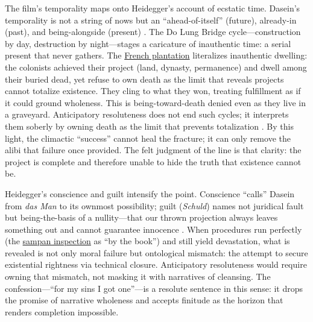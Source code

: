 The film's temporality maps onto Heidegger's account of ecstatic time. Dasein's temporality is
not a string of nows but an ``ahead-of-itself'' (future), already-in (past), and being-alongside
(present) \parencite[pp.~373--383]{HeideggerBT1962}. The Do Lung Bridge cycle—construction by
day, destruction by night—stages a caricature of inauthentic time: a serial present that never
gathers. The \hyperref[scene:french-plantation]{French plantation} literalizes inauthentic
dwelling: the colonists achieved their project (land, dynasty, permanence) and dwell among
their buried dead, yet refuse to own death as the limit that reveals projects cannot totalize
existence. They cling to what they won, treating fulfillment as if it could ground wholeness.
This is being-toward-death denied even as they live in a graveyard. Anticipatory resoluteness
does not end such cycles; it interprets them soberly by owning death as the limit that
prevents totalization \parencite[pp.~307--311]{HeideggerBT1962}. By this light, the climactic
``success'' cannot heal the fracture; it can only remove the alibi that failure once provided.
The felt judgment of the line is that clarity: the project is complete and therefore unable to
hide the truth that existence cannot be.

Heidegger's conscience and guilt intensify the point. Conscience ``calls'' Dasein from \emph{das
	Man} to its ownmost possibility; guilt (\emph{Schuld}) names not juridical fault but
being-the-basis of a nullity—that our thrown projection always leaves something out and cannot
guarantee innocence \parencite[\S\S 57--60, pp.~311--354]{HeideggerBT1962}. When procedures run
perfectly (the \hyperref[scene:sampan]{sampan inspection} as ``by the book'') and still yield
devastation, what is revealed is not only moral failure but ontological mismatch: the attempt
to secure existential rightness via technical closure. Anticipatory resoluteness would require
owning that mismatch, not masking it with narratives of cleansing. The confession—``for my
sins I got one''—is a resolute sentence in this sense: it drops the promise of narrative
wholeness and accepts
finitude as the horizon that renders completion impossible.
